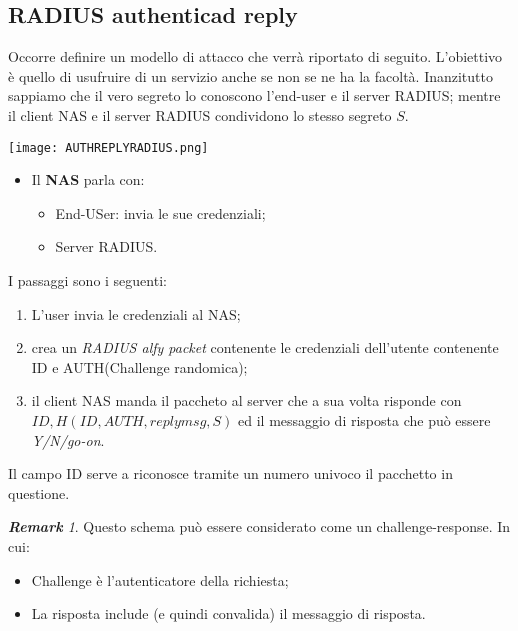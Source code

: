\documentclass{article}
\theoremstyle{remark}
\newtheorem*{remark}{\textbf{Remark}}
\begin{document}
\subsection{RADIUS authenticad reply}
Occorre definire un modello di attacco che verrà riportato di seguito. L'obiettivo è quello di usufruire di un servizio anche se non se ne ha la facoltà. Inanzitutto sappiamo che il vero segreto lo conoscono l'end-user e il server RADIUS; mentre il client NAS e il server RADIUS condividono lo stesso segreto $S$.
\begin{center}
    \texttt{[image: AUTHREPLYRADIUS.png]}
\end{center}
\begin{itemize}
    \item Il \textbf{NAS} parla con:\begin{itemize}
        \item End-USer: invia le sue credenziali;
        \item Server RADIUS.
    \end{itemize}
\end{itemize}
I passaggi sono i seguenti:
\begin{enumerate}
    \item  L'user invia le credenziali al NAS;
    \item crea un \emph{RADIUS alfy packet} contenente le credenziali dell'utente contenente ID e AUTH(Challenge randomica);
    \item il client NAS manda il paccheto al server che a sua volta risponde con \emph{$ID,H(ID,AUTH,replymsg,S)$} ed il messaggio di risposta che può essere \emph{Y/N/go-on}.
\end{enumerate}
Il campo ID serve a riconosce tramite un numero univoco il pacchetto in questione.
\begin{remark}
Questo schema può essere considerato come un challenge-response. In cui:\begin{itemize}
    \item Challenge è l'autenticatore della richiesta;
    \item La risposta include (e quindi convalida) il messaggio di risposta.
\end{itemize}
\end{remark}
\end{document}
